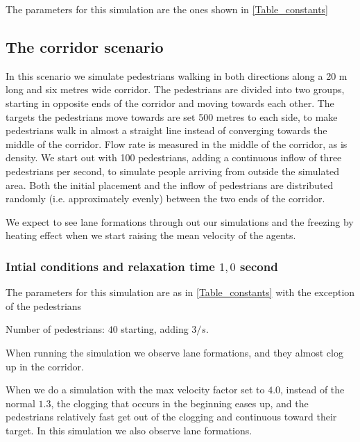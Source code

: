 The parameters for this simulation are the ones shown in \ref{Table_constants}



\subsection{The corridor scenario}
In this scenario we simulate pedestrians walking in both directions along a 20 
m long and six metres wide corridor. The pedestrians are divided into two 
groups, starting in opposite ends of the corridor and moving towards each 
other. The targets the pedestrians move towards are set 500 metres to each 
side, to make pedestrians walk in almost a straight line instead of converging 
towards the middle of the corridor. Flow rate is measured in the middle of the 
corridor, as is density. We start out with 100 pedestrians, adding a 
continuous inflow of three pedestrians per second, to simulate people arriving 
from outside the simulated area. Both the initial placement and the inflow of 
pedestrians are distributed randomly (i.e. approximately evenly) between the 
two ends of the corridor.

We expect to see lane formations through out our simulations
and the freezing by heating effect when we start raising the mean velocity
of the agents.

\subsubsection{Intial conditions and relaxation time $1,0$ second}

The parameters for this simulation are as in \ref{Table_constants} with the exception of the pedestrians
\begin{itemize*}
    \item Number of pedestrians: $40$ starting, adding $3/s$.
\end{itemize*}

When running the simulation we observe lane formations, and they almost clog up
in the corridor.

When we do a simulation with the max velocity factor set to $4.0$, instead of the normal $1.3$, the clogging
that occurs in the beginning eases up, and the pedestrians relatively fast
get out of the clogging and continuous toward their target. In this simulation
we also observe lane formations.


